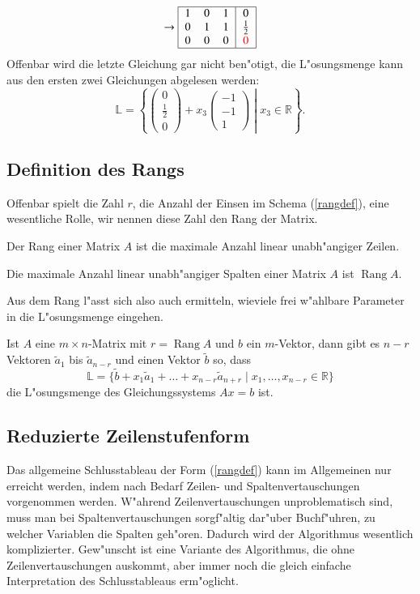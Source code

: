 \begin{beispiel}
\begin{align*}
\rightarrow
\begin{tabular}{|>{$}c<{$}>{$}c<{$}>{$}c<{$}|>{$}c<{$}|}
\hline
1&0&1&0\\
0&1&1&\frac12\\
0&0&0&\color{red}0\\
\hline
\end{tabular}
\end{align*}
Offenbar wird die letzte Gleichung gar nicht ben"otigt, die
L"osungsmenge kann aus den ersten zwei Gleichungen
abgelesen werden:
\[
\mathbb L=
\left\{
\left.
\begin{pmatrix}
0\\\frac12\\0
\end{pmatrix}
+x_3\begin{pmatrix}
-1\\-1\\1
\end{pmatrix}
\;
\right|\;
x_3\in\mathbb R
\right\}.
\]
\end{beispiel}

\subsection{Definition des Rangs}
Offenbar spielt die Zahl $r$, die Anzahl der Einsen im Schema (\ref{rangdef}),
eine wesentliche Rolle, wir nennen diese Zahl den Rang der Matrix.

\begin{definition}
Der Rang einer Matrix $A$ ist die maximale Anzahl linear unabh"angiger Zeilen.
\end{definition}
\begin{satz}
Die maximale Anzahl linear unabh"angiger Spalten einer Matrix $A$ ist
$\operatorname{Rang}A$.
\end{satz}
Aus dem Rang l"asst sich also auch ermitteln, wieviele frei w"ahlbare
Parameter in die L"osungsmenge eingehen.
\begin{satz}
Ist $A$ eine $m\times n$-Matrix mit $r=\operatorname{Rang}A$ 
und $b$ ein $m$-Vektor, dann gibt es $n-r$ Vektoren $\tilde a_1$
bis $\tilde a_{n-r}$ und einen Vektor $\tilde b$ so, dass
\[
\mathbb L
=
\{
\tilde b+x_1\tilde a_1+\dots+x_{n-r}\tilde a_{n+r}\;|\;x_1,\dots,x_{n-r}\in\mathbb R
\}
\]
die L"osungsmenge des Gleichungssystems $Ax=b$ ist.
\end{satz}

\subsection{Reduzierte Zeilenstufenform}
Das allgemeine Schlusstableau der Form (\ref{rangdef}) kann im Allgemeinen nur
erreicht werden, indem nach Bedarf Zeilen- und Spaltenvertauschungen vorgenommen
werden.
W"ahrend Zeilenvertauschungen unproblematisch sind, muss man bei
Spaltenvertauschungen sorgf"altig dar"uber Buchf"uhren, zu welcher Variablen
die Spalten geh"oren.
Dadurch wird der Algorithmus wesentlich komplizierter.
Gew"unscht ist eine Variante des Algorithmus, die ohne Zeilenvertauschungen
auskommt, aber immer noch die gleich einfache Interpretation des
Schlusstableaus erm"oglicht.

